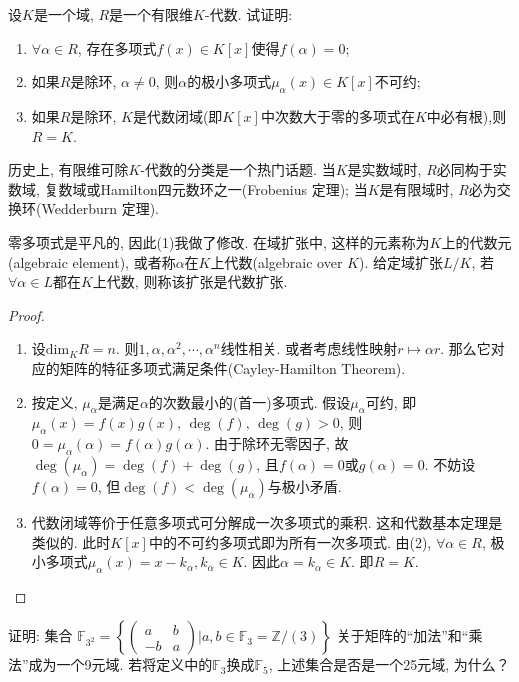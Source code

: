 \begin{problem}
    设$K$是一个域, $R$是一个有限维$K$-代数. 试证明: 
    \begin{enumerate}[(1)]
        \item $\forall \alpha \in R$, 存在多项式$f(x) \in K[x]$使得$f(\alpha) = 0$;
        \item 如果$R$是除环, $\alpha \neq 0$, 则$\alpha$的极小多项式$\mu_\alpha(x) \in K[x]$不可约;
        \item 如果$R$是除环, $K$是代数闭域(即$K[x]$中次数大于零的多项式在$K$中必有根),则$R = K$.
    \end{enumerate}
    历史上, 有限维可除$K$-代数的分类是一个热门话题. 当$K$是实数域时, $R$必同构于实数域, 复数域或Hamilton四元数环之一(Frobenius 定理); 当$K$是有限域时, $R$必为交换环(Wedderburn 定理).
\end{problem}

\begin{remark}
    零多项式是平凡的, 因此(1)我做了修改. 在域扩张中, 这样的元素称为$K$上的代数元(algebraic element), 或者称$\alpha$在$K$上代数(algebraic over $K$). 给定域扩张$L/K$, 若$\forall \alpha \in L$都在$K$上代数, 则称该扩张是代数扩张.
\end{remark}

\begin{proof}
    \begin{enumerate}[(1)]
        \item 设$\mathrm{dim}_K R = n$. 则$1, \alpha, \alpha^2, \cdots, \alpha^n$线性相关. 或者考虑线性映射$r \mapsto \alpha r$. 那么它对应的矩阵的特征多项式满足条件(Cayley-Hamilton Theorem).
        \item 按定义, $\mu_\alpha$是满足$\alpha$的次数最小的(首一)多项式. 假设$\mu_\alpha$可约, 即$\mu_\alpha(x) = f(x)g(x),\, \deg(f),\, \deg(g)> 0$, 则$0 = \mu_\alpha(\alpha) = f(\alpha)g(\alpha)$. 由于除环无零因子, 故$\deg(\mu_\alpha) = \deg(f) + \deg(g)$, 且$f(\alpha) = 0$或$g(\alpha) = 0$. 不妨设$f(\alpha) = 0$, 但$\deg(f) < \deg (\mu_\alpha)$与极小矛盾.
        \item 代数闭域等价于任意多项式可分解成一次多项式的乘积. 这和代数基本定理是类似的. 此时$K[x]$中的不可约多项式即为所有一次多项式. 由(2), $\forall \alpha \in R$, 极小多项式$\mu_\alpha(x) = x - k_\alpha, k_\alpha \in K$. 因此$\alpha = k_\alpha \in K$. 即$R = K$.
    \end{enumerate}
\end{proof}

\begin{problem}
    证明: 集合
    \(
        \mathbb{F}_{3^2} =
        \left\{
            \begin{pmatrix}
                a & b\\
                -b & a
            \end{pmatrix}
        \bigg| a, b \in \mathbb{F}_3 = \mathbb{Z}/(3)
        \right\}
    \)
    关于矩阵的“加法”和“乘法”成为一个9元域. 若将定义中的$\mathbb{F}_3$换成$\mathbb{F}_5$, 上述集合是否是一个25元域, 为什么？
\end{problem}

